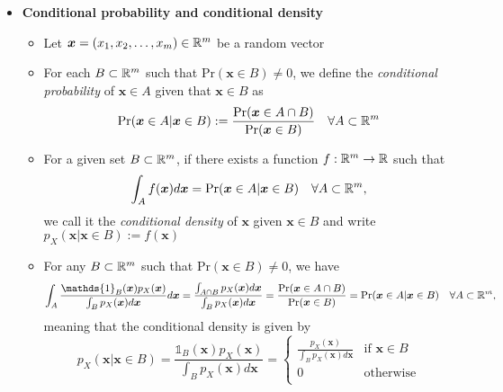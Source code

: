 \documentclass[12pt,a4paper]{article}
\begin{document}
\begin{itemize}

\item \textbf{Conditional probability and conditional density}
  \begin{itemize}
  \item Let $\bm{x} = (x_{1},x_{2},\ldots, x_{m})\in \mathbb{R}^{m}$ be a random vector
  \item For each $B\subset \mathbb{R}^{m}$ such that $\text{Pr}(\bm{x}\in B)\neq 0$,
    we define the \emph{conditional probability} of $\bm{x}\in A$ given that $\bm{x}\in B$ as
    \begin{equation}\nonumber%
      \text{Pr}(\bm{x}\in A|\bm{x}\in B)
      := \frac{\text{Pr}(\bm{x}\in A\cap B)}{\text{Pr}(\bm{x}\in B)}
      \quad \forall A\subset \R^{m}
    \end{equation}
  \item For a given set $B\subset \mathbb{R}^{m}$,
    if there exists a function
    $f:\mathbb{R}^{m}\to \mathbb{R}$ such that
    \begin{equation}\label{eq:xB}%
      \int_{A}f(\bm{x})d\bm{x}
      =
      \text{Pr}(\bm{x}\in A|\bm{x}\in B)
      \quad \forall A\subset \R^{m},
    \end{equation}
    we call it the \emph{conditional density} of $\bm{x}$ given $\bm{x}\in B$
    and write $p_{X}(\bm{x}|\bm{x}\in B) := f(\bm{x})$
  \item For any $B\subset \mathbb{R}^{m}$ such that $\text{Pr}(\bm{x}\in B)\neq 0$, we have
    \begin{equation}
      \int_{A}\frac{\mathds{1}_{B}(\bm{x})p_{X}(\bm{x})}{\int_{B}p_{X}(\bm{x})d\bm{x}}d\bm{x}
      = 
      \frac{\int_{A\cap B}p_{X}(\bm{x})d\bm{x}}{\int_{B}p_{X}(\bm{x})d\bm{x}}
      = 
      \frac{\text{Pr}(\bm{x}\in A\cap B)}{\text{Pr}(\bm{x}\in B)}
      =
      \text{Pr}(\bm{x}\in A|\bm{x}\in B)
      \nonumber%
      \quad \forall A\subset \R^{m},
    \end{equation}
    meaning that the conditional density is given by
    \begin{equation}\label{eq:pxB}%
      p_{X}(\bm{x}|\bm{x}\in B)
      = \frac{\mathds{1}_{B}(\bm{x})p_{X}(\bm{x})}{\int_{B}p_{X}(\bm{x})d\bm{x}}
      =
      \begin{cases}
        \frac{p_{X}(\bm{x})}{\int_{B}p_{X}(\bm{x})d\bm{x}} & \text{if $\bm{x}\in B$} \\
        0 & \text{otherwise} \\
      \end{cases}
    \end{equation}

\end{itemize}
\end{itemize}
\end{document}
